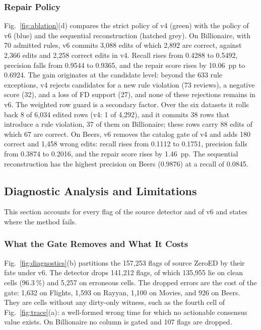 \documentclass[conference]{IEEEtran}
\begin{document}
\subsubsection{Repair Policy}
Fig.~\ref{fig:ablation}(d) compares the strict policy of v4 (green) with the policy of v6 (blue) and the sequential reconstruction (hatched grey). On Billionaire, with 70 admitted rules, v6 commits 3,088 edits of which 2,892 are correct, against 2,366 edits and 2,258 correct edits in v4. Recall rises from 0.4288 to 0.5492, precision falls from 0.9544 to 0.9365, and the repair score rises by 10.06~pp to 0.6924. The gain originates at the candidate level: beyond the 633 rule exceptions, v4 rejects candidates for a new rule violation (73 reviews), a negative score (32), and a loss of FD support (27), and none of these rejections remains in v6. The weighted row guard is a secondary factor. Over the six datasets it rolls back 8 of 6,034 edited rows (v4: 1 of 4,292), and it commits 38 rows that introduce a rule violation, 37 of them on Billionaire; these rows carry 88 edits of which 67 are correct. On Beers, v6 removes the catalog gate of v4 and adds 180 correct and 1,458 wrong edits: recall rises from 0.1112 to 0.1751, precision falls from 0.3874 to 0.2016, and the repair score rises by 1.46~pp. The sequential reconstruction has the highest precision on Beers (0.9876) at a recall of 0.0845.

\subsection{Diagnostic Analysis and Limitations}
\label{subsec:exp_diagnostics}

This section accounts for every flag of the source detector and of v6 and states where the method fails.

\subsubsection{What the Gate Removes and What It Costs}
Fig.~\ref{fig:diagnostics}(b) partitions the 157,253 flags of source ZeroED by their fate under v6. The detector drops 141,212 flags, of which 135,955 lie on clean cells ($96.3~\%$) and 5,257 on erroneous cells. The dropped errors are the cost of the gate: 1,632 on Flights, 1,593 on Rayyan, 1,100 on Movies, and 926 on Beers. They are cells without any dirty-only witness, such as the fourth cell of Fig.~\ref{fig:trace}(a): a well-formed wrong time for which no actionable consensus value exists. On Billionaire no column is gated and 107 flags are dropped.
\end{document}
